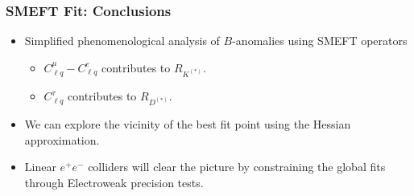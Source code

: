 \documentclass[mathserif, 10pt, dvipsnames]{beamer}
\begin{document}
\begin{frame}\frametitle{SMEFT Fit: Conclusions}

    \begin{itemize}
        \item Simplified phenomenological analysis of $B$-anomalies using SMEFT operators
              \begin{itemize}
                  \item $C_{\ell q}^\mu-C_{\ell q}^e$ contributes to  $R_{K^{(*)}}$.
                  \item $C_{\ell q}^\tau$ contributes to  $R_{D^{(*)}}$.
              \end{itemize}
\item We can explore the vicinity of the best fit point using the Hessian approximation.
\item Linear $e^+ e^-$ colliders will clear the picture by constraining the global fits through Electroweak precision tests.
    \end{itemize}

\end{frame}
\end{document}
